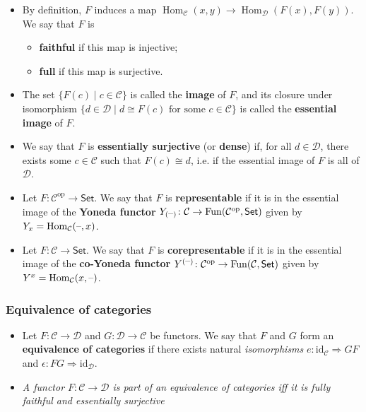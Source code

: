 \documentclass[10pt]{article}
\newcommand{\Set}{\mathsf{Set}}
\newcommand{\id}{\mathrm{id}}
\newcommand{\ccat}{\mathcal{C}}
\newcommand{\dcat}{\mathcal{D}}
\newcommand{\nt}{\Rightarrow}
\newcommand{\Fun}{\mathrm{Fun}}
\newcommand{\blank}{\hbox{--}}
\newcommand{\op}[1]{{#1}^\text{op}}
\DeclareMathOperator{\Hom}{Hom}
\begin{document}
            \begin{itemize}
                \item By definition, $F$ induces a map $\Hom_\ccat(x,y)\to\Hom_\dcat(F(x),F(y))$.
                    We say that $F$ is
                    \begin{itemize}
                        \item \textbf{faithful} if this map is injective;
                        \item \textbf{full} if this map is surjective.
                    \end{itemize}
                \item The set $\{F(c)\mid c\in\ccat\}$ is called the \textbf{image} of $F$, and its closure under isomorphism $\{d\in\dcat\mid d\cong F(c)\text{ for some }c\in\ccat\}$ is called the \textbf{essential image} of $F$.
                \item We say that $F$ is \textbf{essentially surjective} (or \textbf{dense}) if, for all $d\in\dcat$, there exists some $c\in\ccat$ such that $F(c)\cong d$, i.e. if the essential image of $F$ is all of $\dcat$.
                \item Let $F\colon\op{\ccat}\to\Set$.
                    We say that $F$ is \textbf{representable} if it is in the essential image of the \textbf{Yoneda functor} $Y_{(\blank)}\colon\ccat\to\Fun(\op{\ccat},\Set)$ given by $Y_x=\Hom_\ccat(\blank,x)$.
                \item Let $F\colon\ccat\to\Set$.
                    We say that $F$ is \textbf{corepresentable} if it is in the essential image of the \textbf{co-Yoneda functor} $Y^{(\blank)}\colon\op{\ccat}\to\Fun(\ccat,\Set)$ given by $Y^x=\Hom_\ccat(x,\blank)$.
            \end{itemize}

            \subsubsection{Equivalence of categories}

                \begin{itemize}
                    \item Let $F\colon\ccat\to\dcat$ and $G\colon\dcat\to\ccat$ be functors.
                        We say that $F$ and $G$ form an \textbf{equivalence of categories} if there exists natural \emph{isomorphisms} $e\colon\id_\ccat\nt GF$ and $\epsilon\colon FG\nt\id_\dcat$.
                    \item \emph{A functor $F\colon\ccat\to\dcat$ is part of an equivalence of categories iff it is fully faithful and essentially surjective}
                \end{itemize}
\end{document}

